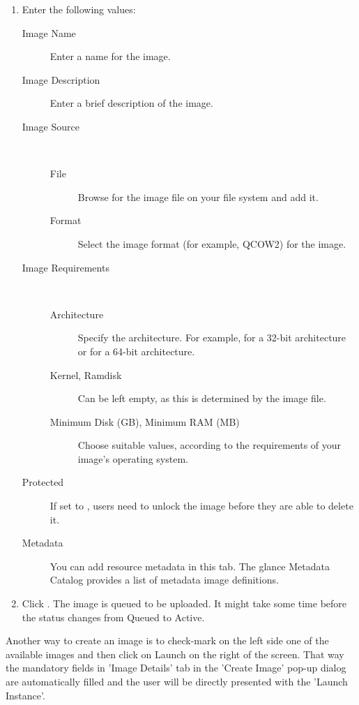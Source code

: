 \begin{enumerate}
\item Enter the following values:
  \begin{description}
  \item[Image Name] Enter a name for the image.
  \item[Image Description] Enter a brief description of the image.
  \item[Image Source]\ 
    \begin{description}
    \item[File] Browse for the image file on your file system and add
      it.
    \item[Format] Select the image format (for example, QCOW2) for the
      image.
    \end{description}
  \item[Image Requirements]\ 
    \begin{description}
    \item[Architecture] Specify the architecture. For example,
      \strong{i386} for a 32-bit architecture or  for
      a 64-bit architecture.
    \item[Kernel, Ramdisk] Can be left empty, as this is determined by
      the image file.
    \item[Minimum Disk (GB), Minimum RAM (MB)] Choose suitable values,
      according to the requirements of your image's operating system.
    \end{description}
  \item[Protected] If set to \strong{Yes}, users need to unlock the
    image before they are able to delete it.
  \item[Metadata] You can add resource metadata in this tab. The
    glance Metadata Catalog provides a list of metadata image
    definitions.
  \end{description}
\item Click .
  The image is queued to be uploaded. It might take some time before
  the status changes from Queued to Active.
\end{enumerate}

Another way to create an image is to check-mark on the left side one of the available images and then click on Launch on the right of the screen. That way the mandatory fields in 'Image Details' tab in the 'Create Image' pop-up dialog are automatically filled and the user will be directly presented with the 'Launch Instance'.

